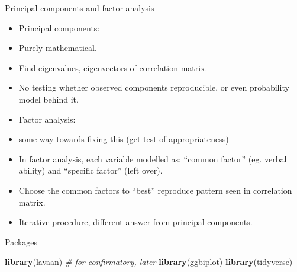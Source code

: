 \documentclass[ignorenonframetext,]{beamer}
\newenvironment{Shaded}{\begin{snugshade}}{\end{snugshade}}
\newcommand{\CommentTok}[1]{\textcolor[rgb]{0.56,0.35,0.01}{\textit{#1}}}
\newcommand{\KeywordTok}[1]{\textcolor[rgb]{0.13,0.29,0.53}{\textbf{#1}}}
\newcommand{\NormalTok}[1]{#1}
\begin{document}
\begin{frame}{Principal components and factor analysis}
\protect\hypertarget{principal-components-and-factor-analysis}{}

\begin{itemize}
\item
  Principal components:
\item
  Purely mathematical.
\item
  Find eigenvalues, eigenvectors of correlation matrix.
\item
  No testing whether observed components reproducible, or even
  probability model behind it.
\item
  Factor analysis:
\item
  some way towards fixing this (get test of appropriateness)
\item
  In factor analysis, each variable modelled as: ``common factor'' (eg.
  verbal ability) and ``specific factor'' (left over).
\item
  Choose the common factors to ``best'' reproduce pattern seen in
  correlation matrix.
\item
  Iterative procedure, different answer from principal components.
\end{itemize}

\end{frame}

\begin{frame}[fragile]{Packages}
\protect\hypertarget{packages-10}{}

\begin{Shaded}
\begin{Highlighting}[]
\KeywordTok{library}\NormalTok{(lavaan) }\CommentTok{# for confirmatory, later}
\KeywordTok{library}\NormalTok{(ggbiplot)}
\KeywordTok{library}\NormalTok{(tidyverse)}
\end{Highlighting}
\end{Shaded}

\end{frame}
\end{document}
